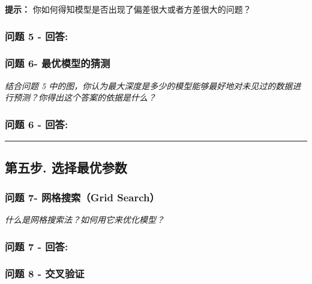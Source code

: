 \documentclass[11pt]{article}
\begin{document}
\textbf{提示：} 你如何得知模型是否出现了偏差很大或者方差很大的问题？

    \subsubsection{问题 5 - 回答:}\label{ux95eeux9898-5---ux56deux7b54}

    \subsubsection{问题 6-
最优模型的猜测}\label{ux95eeux9898-6--ux6700ux4f18ux6a21ux578bux7684ux731cux6d4b}

\emph{结合问题 5
中的图，你认为最大深度是多少的模型能够最好地对未见过的数据进行预测？你得出这个答案的依据是什么？}

    \subsubsection{问题 6 - 回答:}\label{ux95eeux9898-6---ux56deux7b54}

    \begin{center}\rule{0.5\linewidth}{\linethickness}\end{center}

\subsection{第五步.
选择最优参数}\label{ux7b2cux4e94ux6b65.-ux9009ux62e9ux6700ux4f18ux53c2ux6570}

    \subsubsection{问题 7- 网格搜索（Grid
Search）}\label{ux95eeux9898-7--ux7f51ux683cux641cux7d22grid-search}

\emph{什么是网格搜索法？如何用它来优化模型？}

    \subsubsection{问题 7 - 回答:}\label{ux95eeux9898-7---ux56deux7b54}

    \subsubsection{问题 8 -
交叉验证}\label{ux95eeux9898-8---ux4ea4ux53c9ux9a8cux8bc1}
\end{document}
